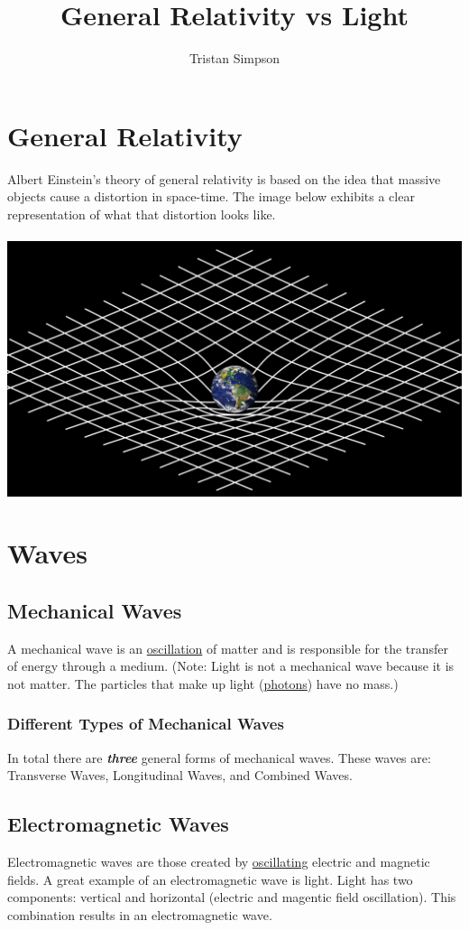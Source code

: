 \documentclass{article}
\title{General Relativity vs Light}
\author{Tristan Simpson}
\begin{document}
\maketitle
\tableofcontents
\section{General Relativity}\label{sec:generalrelativity}
Albert Einstein's theory of general relativity is based on the idea that massive objects cause a distortion in space-time. The image below exhibits a clear representation of what that distortion looks like.\\\\
\includegraphics[scale=0.30]{images/general_relativity.png}


\section{Waves}
\subsection{Mechanical Waves}
A mechanical wave is an \hyperref[sec:oscillation]{oscillation} of matter and is responsible for the transfer of energy through a medium. (Note: Light is not a mechanical wave because it is not matter. The particles that make up light (\hyperref[sec:photons]{photons}) have no mass.)
\subsubsection{Different Types of Mechanical Waves}
In total there are \textbf{\textit{three}} general forms of mechanical waves. These waves are: Transverse Waves, Longitudinal Waves, and Combined Waves.
\subsection{Electromagnetic Waves}
Electromagnetic waves are those created by \hyperref[sec:oscillation]{oscillating} electric and magnetic fields. A great example of an electromagnetic wave is light. Light has two components: vertical and horizontal (electric and magentic field oscillation). This combination results in an electromagnetic wave.
\end{document}
